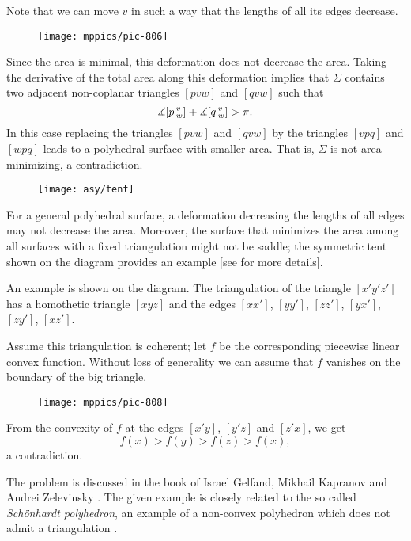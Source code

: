 Note that we can move $v$ in such a way that the lengths of all its edges decrease.

\begin{wrapfigure}{r}{43 mm}
\vskip0mm
\centering
\texttt{[image: mppics/pic-806]}
\end{wrapfigure}

Since the area is minimal,  this deformation does not decrease the area. 
Taking the derivative of the total area along this deformation implies that $\Sigma$
contains two adjacent non-coplanar triangles $[pvw]$ and $[qvw]$ such that
\[\measuredangle [p\,{}^{v}_{w}]+\measuredangle [q\,{}^{v}_{w}]> \pi.\]
In this case replacing the triangles $[pvw]$ and $[qvw]$
by the triangles $[vpq]$ and $[wpq]$
leads to a polyhedral surface with smaller area.
That is, $\Sigma$ is not area minimizing, a contradiction.
\qeds

{

\begin{wrapfigure}{r}{43 mm}
\vskip-8mm
\centering
\texttt{[image: asy/tent]}
\end{wrapfigure}

For a general polyhedral surface, a deformation decreasing the lengths of all edges may not decrease the area.
Moreover, the surface that minimizes the area among all surfaces with a fixed  triangulation might not be saddle;
the symmetric tent shown on the diagram provides an example [see  for more details].

}



An example is shown on the diagram.
The triangulation of the triangle $[x'y'z']$ has a homothetic triangle $[xyz]$ and the edges
$[xx']$, $[yy']$, $[zz']$, 
$[yx']$, $[zy']$, $[xz']$.

\medskip

Assume this triangulation is coherent;
let $f$ be the corresponding piecewise linear convex function.
Without loss of generality we can assume that $f$ vanishes on the boundary of the big triangle.

\begin{wrapfigure}{r}{33 mm}
\vskip0mm
\centering
\texttt{[image: mppics/pic-808]}
\end{wrapfigure}

From the convexity of $f$ at the edges $[x'y]$,  $[y'z]$ and $[z'x]$, we get 
\[f(x)>f(y)>f(z)>f(x),\]
a contradiction.
\qeds

The problem is discussed in the book of 
Israel Gelfand, 
Mikhail Kapranov 
and Andrei Zelevinsky  \cite[see 7C in][]{GKZ}.
The given example is closely related to the so called \emph{Sch\"onhardt polyhedron}, an example of a non-convex polyhedron which does not admit a triangulation \cite{schoenhardt}.

